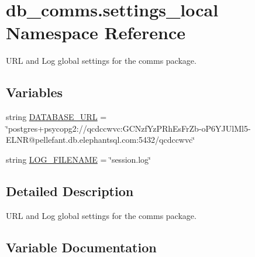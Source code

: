 \hypertarget{namespacedb__comms_1_1settings__local}{}\section{db\+\_\+comms.\+settings\+\_\+local Namespace Reference}
\label{namespacedb__comms_1_1settings__local}


U\+R\+L and Log global settings for the comms package.  


\subsection*{Variables}
\begin{DoxyCompactItemize}
\item 
string \hyperlink{namespacedb__comms_1_1settings__local_a8eb71159b43e28de397305844fa2a891}{D\+A\+T\+A\+B\+A\+S\+E\+\_\+\+U\+R\+L} = \char`\"{}postgres+psycopg2\+://qcdccwvc\+:\+G\+C\+Nzf\+Yz\+P\+Rh\+Es\+Fr\+Zb-\/o\+P6\+Y\+J\+Ul\+Ml5-\/E\+L\+N\+R@pellefant.\+db.\+elephantsql.\+com\+:5432/qcdccwvc\char`\"{}
\item 
string \hyperlink{namespacedb__comms_1_1settings__local_a909832b9d5522628a8edde898db1b8b4}{L\+O\+G\+\_\+\+F\+I\+L\+E\+N\+A\+M\+E} = \char`\"{}session.\+log\char`\"{}
\end{DoxyCompactItemize}


\subsection{Detailed Description}
U\+R\+L and Log global settings for the comms package. 



\subsection{Variable Documentation}
\hypertarget{namespacedb__comms_1_1settings__local_a8eb71159b43e28de397305844fa2a891}{}
